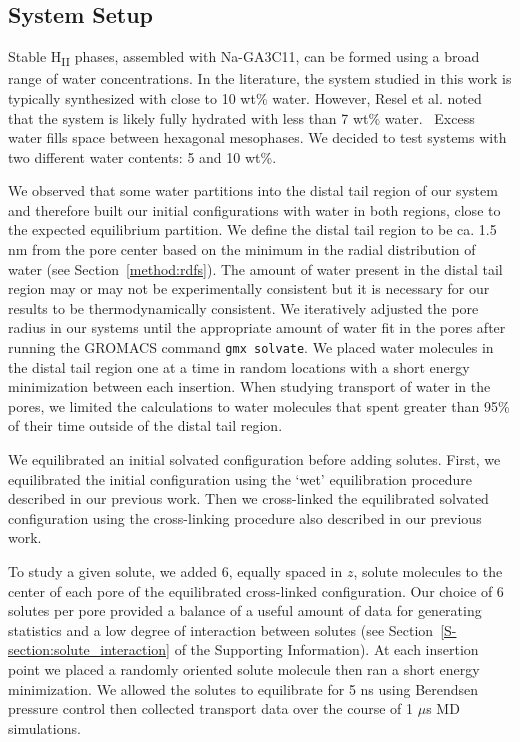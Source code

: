 \documentclass[journal=jpcbfk,manuscript=article]{achemso}
\begin{document}
  \subsection{System Setup}\label{method:system_setup}

  Stable H\textsubscript{II} phases, assembled with Na-GA3C11, can be formed
  using a broad range of water concentrations. In the literature, the system 
  studied in this work is typically synthesized with close to 10 wt\% water.
  \cite{smith_ordered_1997, zhou_new_2007} However, Resel et al. noted that the
  system is likely fully hydrated with less than 7 wt\% water.~\cite{resel_h2-phase_2000}
  Excess water fills space between hexagonal mesophases. We decided to test 
  systems with two different water contents: 5 and 10 wt\%.

  We observed that 
  some
  water partitions into the distal tail region of our system and therefore
  built our initial configurations with water in both regions, close to the expected
  equilibrium partition. We define the distal tail region to be ca. 1.5 nm from the pore
  center based on the minimum in the radial distribution of water
  (see Section~\ref{method:rdfs}). The amount of water present in the distal tail region
  may or may not be experimentally consistent but it is necessary for our results to be 
  thermodynamically consistent. We iteratively adjusted the pore radius in our systems
  until the appropriate amount of water fit in the pores after running the GROMACS command
  \texttt{gmx solvate}. We placed water molecules in the distal tail region one at a time
  in random locations with a short energy minimization between each insertion. When 
  studying transport of water in the pores, we limited the calculations to water molecules
  that spent greater than 95\% of their time outside of the distal tail region.

  We equilibrated an initial solvated configuration before adding solutes. First, we 
  equilibrated the initial configuration using the `wet' equilibration procedure 
  described in our previous work. Then we cross-linked the equilibrated solvated 
  configuration using the cross-linking procedure also described in our previous 
  work.~\cite{coscia_understanding_2019}

  To study a given solute, we added 6, equally spaced in $z$, solute molecules to the
  center of each pore of the equilibrated cross-linked configuration. Our choice of 6
  solutes per pore provided a balance of a useful amount of data for generating 
  statistics and a low degree of interaction between solutes (see 
  Section~\ref{S-section:solute_interaction} of the Supporting Information). At each
  insertion point we placed a randomly oriented solute molecule then ran a short 
  energy minimization. We allowed the solutes to equilibrate for 5 ns using Berendsen
  pressure control then collected transport data over the course of 1 $\mu$s MD simulations.
\end{document}
